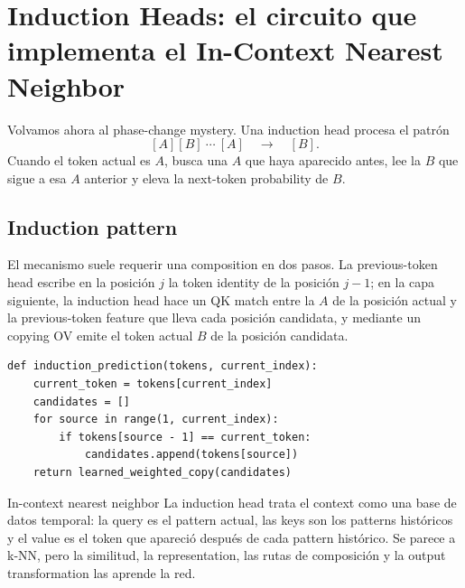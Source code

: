\section{Induction Heads: el circuito que implementa el In-Context Nearest Neighbor}

Volvamos ahora al phase-change mystery. Una induction head procesa el patrón
\[
[A][B]\ \cdots\ [A]\quad\longrightarrow\quad[B].
\]
Cuando el token actual es $A$, busca una $A$ que haya aparecido antes, lee la $B$ que sigue a esa $A$ anterior y eleva la next-token probability de $B$.

\subsection{Induction pattern}

El mecanismo suele requerir una composition en dos pasos. La previous-token head escribe en la posición $j$ la token identity de la posición $j-1$; en la capa siguiente, la induction head hace un QK match entre la $A$ de la posición actual y la previous-token feature que lleva cada posición candidata, y mediante un copying OV emite el token actual $B$ de la posición candidata.


\begin{lstlisting}[caption={Pseudocódigo conceptual del induction-head algorithm.}]
def induction_prediction(tokens, current_index):
    current_token = tokens[current_index]
    candidates = []
    for source in range(1, current_index):
        if tokens[source - 1] == current_token:
            candidates.append(tokens[source])
    return learned_weighted_copy(candidates)
\end{lstlisting}

\begin{importantbox}{In-context nearest neighbor}
La induction head trata el context como una base de datos temporal: la query es el pattern actual, las keys son los patterns históricos y el value es el token que apareció después de cada pattern histórico. Se parece a k-NN, pero la similitud, la representation, las rutas de composición y la output transformation las aprende la red.
\end{importantbox}


